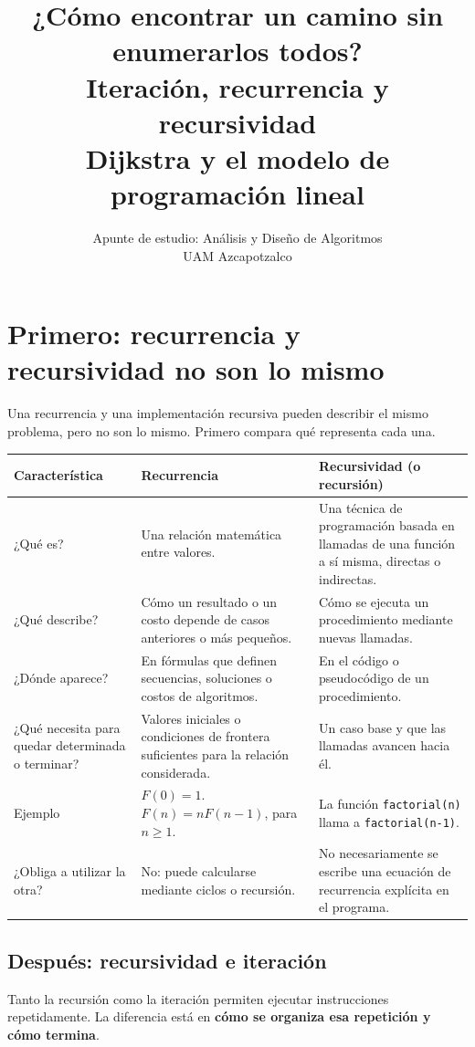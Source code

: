 \documentclass[11pt,letterpaper]{article}
\title{\textbf{¿Cómo encontrar un camino sin enumerarlos todos?}\\[4pt]\large Iteración, recurrencia y recursividad\\Dijkstra y el modelo de programación lineal}
\author{Apunte de estudio: Análisis y Diseño de Algoritmos\\UAM Azcapotzalco}
\date{}
\begin{document}
\maketitle

\section{Primero: recurrencia y recursividad no son lo mismo}
Una recurrencia y una implementación recursiva pueden describir el mismo problema, pero no son lo mismo. Primero compara qué representa cada una.

\begin{center}
\begin{tabularx}{\linewidth}{>{\raggedright\arraybackslash}p{2.7cm}XX}
\toprule
Característica & Recurrencia & Recursividad (o recursión)\\
\midrule
¿Qué es? & Una relación matemática entre valores. & Una técnica de programación basada en llamadas de una función a sí misma, directas o indirectas.\\
¿Qué describe? & Cómo un resultado o un costo depende de casos anteriores o más pequeños. & Cómo se ejecuta un procedimiento mediante nuevas llamadas.\\
¿Dónde aparece? & En fórmulas que definen secuencias, soluciones o costos de algoritmos. & En el código o pseudocódigo de un procedimiento.\\
¿Qué necesita para quedar determinada o terminar? & Valores iniciales o condiciones de frontera suficientes para la relación considerada. & Un caso base y que las llamadas avancen hacia él.\\
Ejemplo & $F(0)=1$.\newline $F(n)=nF(n-1)$, para $n\geq1$. & La función \texttt{factorial(n)} llama a \texttt{factorial(n-1)}.\\
¿Obliga a utilizar la otra? & No: puede calcularse mediante ciclos o recursión. & No necesariamente se escribe una ecuación de recurrencia explícita en el programa.\\
\bottomrule
\end{tabularx}
\end{center}

\subsection{Después: recursividad e iteración}
Tanto la recursión como la iteración permiten ejecutar instrucciones repetidamente. La diferencia está en \textbf{cómo se organiza esa repetición y cómo termina}.
\end{document}
